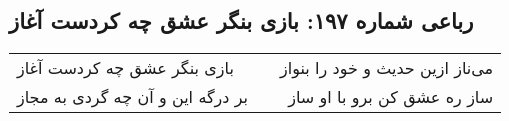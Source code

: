 \begin{center}
\section*{رباعی شماره ۱۹۷: بازی بنگر عشق چه کردست آغاز}
\label{sec:sh197}
\begin{longtable}{l p{0.5cm} r}
بازی بنگر عشق چه کردست آغاز
&&
می‌ناز ازین حدیث و خود را بنواز
\\
بر درگه این و آن چه گردی به مجاز
&&
ساز ره عشق کن برو با او ساز
\\
\end{longtable}
\end{center}

